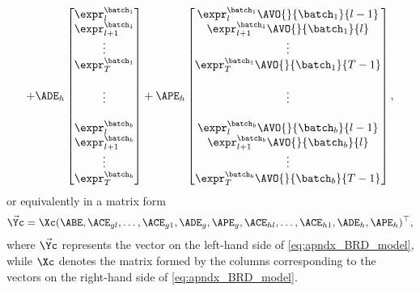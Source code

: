 \begin{equation}
\begin{aligned}
        + \ADE_h 
        \begin{bmatrix}
            \expr_{l}^{\batch_1}
            \\
            \expr_{l+1}^{\batch_1}
            \\
            \vdots
            \\
            \expr_{T}^{\batch_1}
            \\
            \\
            \vdots
            \\
            \\
            \expr_{l}^{\batch_b}
            \\
            \expr_{l+1}^{\batch_b}
            \\
            \vdots
            \\
            \expr_{T}^{\batch_b}
        \end{bmatrix}
        + \APE_h
        \begin{bmatrix}
            \expr_{l}^{\batch_1} \AVO{}{\batch_1}{l-1}
            \\
            \expr_{l+1}^{\batch_1} \AVO{}{\batch_1}{l}
            \\
            \vdots
            \\
            \expr_{T}^{\batch_1} \AVO{}{\batch_1}{T-1}
            \\
            \\
            \vdots
            \\
            \\
            \expr_{l}^{\batch_b} \AVO{}{\batch_b}{l-1}
            \\
            \expr_{l+1}^{\batch_b} \AVO{}{\batch_b}{l}
            \\
            \vdots
            \\
            \expr_{T}^{\batch_b} \AVO{}{\batch_b}{T-1}
        \end{bmatrix},
    \end{aligned}
\end{equation}
%
or equivalently in a matrix form
% 
\begin{align*}
    \Vec{\Yc} = \Xc (\ABE, \ACE_{gl}, \ldots, \ACE_{g1}, \ADE_g, \APE_g, \ACE_{hl}, \ldots, \ACE_{h1}, \ADE_h, \APE_h)^\top,
\end{align*}
% 
where $\Vec{\Yc}$ represents the vector on the left-hand side of \eqref{eq:apndx_BRD_model}, while $\Xc$ denotes the matrix formed by the columns corresponding to the vectors on the right-hand side of \eqref{eq:apndx_BRD_model}.

